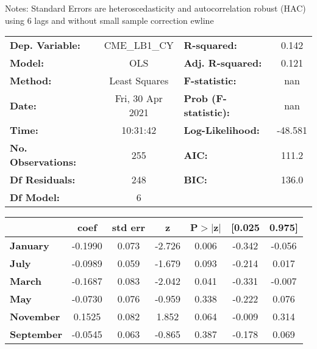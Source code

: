 Notes: \newline
 [1] Standard Errors are heteroscedasticity and autocorrelation robust (HAC) using 6 lags and without small sample correction
ewline\begin{center}
\begin{tabular}{lclc}
\toprule
\textbf{Dep. Variable:}    &   CME\_LB1\_CY   & \textbf{  R-squared:         } &     0.142   \\
\textbf{Model:}            &       OLS        & \textbf{  Adj. R-squared:    } &     0.121   \\
\textbf{Method:}           &  Least Squares   & \textbf{  F-statistic:       } &       nan   \\
\textbf{Date:}             & Fri, 30 Apr 2021 & \textbf{  Prob (F-statistic):} &      nan    \\
\textbf{Time:}             &     10:31:42     & \textbf{  Log-Likelihood:    } &   -48.581   \\
\textbf{No. Observations:} &         255      & \textbf{  AIC:               } &     111.2   \\
\textbf{Df Residuals:}     &         248      & \textbf{  BIC:               } &     136.0   \\
\textbf{Df Model:}         &           6      & \textbf{                     } &             \\
\bottomrule
\end{tabular}
\begin{tabular}{lcccccc}
                   & \textbf{coef} & \textbf{std err} & \textbf{z} & \textbf{P$> |$z$|$} & \textbf{[0.025} & \textbf{0.975]}  \\
\midrule
\textbf{January}   &      -0.1990  &        0.073     &    -2.726  &         0.006        &       -0.342    &       -0.056     \\
\textbf{July}      &      -0.0989  &        0.059     &    -1.679  &         0.093        &       -0.214    &        0.017     \\
\textbf{March}     &      -0.1687  &        0.083     &    -2.042  &         0.041        &       -0.331    &       -0.007     \\
\textbf{May}       &      -0.0730  &        0.076     &    -0.959  &         0.338        &       -0.222    &        0.076     \\
\textbf{November}  &       0.1525  &        0.082     &     1.852  &         0.064        &       -0.009    &        0.314     \\
\textbf{September} &      -0.0545  &        0.063     &    -0.865  &         0.387        &       -0.178    &        0.069     \\

\end{tabular}
\end{center}
